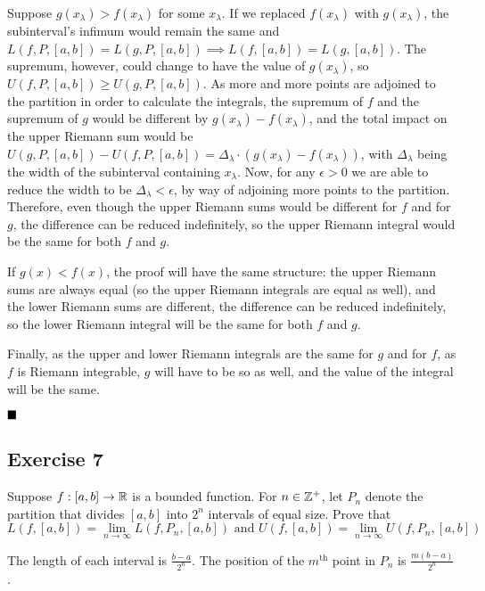 Suppose $g(x_\lambda) > f(x_\lambda)$ for some $x_\lambda$. If we replaced $f(x_\lambda)$ with $g(x_\lambda)$, the subinterval's infimum would remain the same and $L(f,P,[a,b]) = L(g,P,[a,b])\implies L(f,[a,b])=L(g,[a,b])$. The supremum, however, could change to have the value of $g(x_\lambda)$, so $U(f,P,[a,b]) \geq U(g,P,[a,b])$. As more and more points are adjoined to the partition in order to calculate the integrals, the supremum of $f$ and the supremum of $g$ would be different by $g(x_\lambda)-f(x_\lambda)$, and the total impact on the upper Riemann sum would be $U(g,P,[a,b])-U(f,P,[a,b]) = \Delta_\lambda\cdot(g(x_\lambda)-f(x_\lambda))$, with $\Delta_\lambda$ being the width of the subinterval containing $x_\lambda$. Now, for any $\epsilon>0$ we are able to reduce the width to be $\Delta_\lambda<\epsilon$, by way of adjoining more points to the partition. Therefore, even though the upper Riemann sums would be different for $f$ and for $g$, the difference can be reduced indefinitely, so the upper Riemann integral would be the same for both $f$ and $g$.

If $g(x) < f(x)$, the proof will have the same structure: the upper Riemann sums are always equal (so the upper Riemann integrals are equal as well), and the lower Riemann sums are different, the difference can be reduced indefinitely, so the lower Riemann integral will be the same for both $f$ and $g$.

Finally, as the upper and lower Riemann integrals are the same for $g$ and for $f$, as $f$ is Riemann integrable, $g$ will have to be so as well, and the value of the integral will be the same.

$\qed$

\subsection{Exercise 7}

\begin{formulationBox}
	Suppose $f:[a,b]\rightarrow\mathbb{R}$ is a bounded function. For $n\in\mathbb{Z}^+$, let $P_n$ denote the partition that divides $[a,b]$ into $2^n$ intervals of equal size. Prove that \[L(f,[a,b]) = \lim_{n\rightarrow\infty}L(f,P_n,[a,b]) \textrm{ and } U(f,[a,b]) = \lim_{n\rightarrow\infty}U(f,P_n,[a,b])\]
\end{formulationBox}

The length of each interval is $\frac{b-a}{2^n}$. The position of the $m^\textrm{th}$ point in $P_n$ is $\frac{m(b-a)}{2^n}$.

